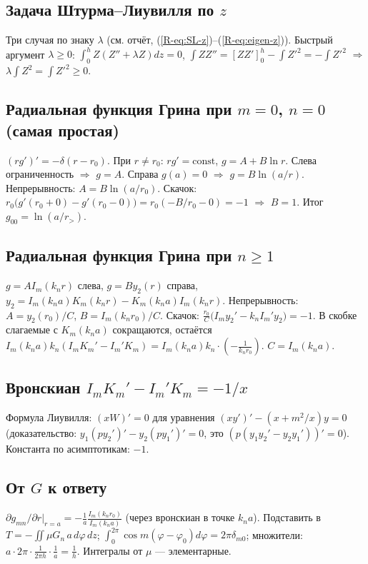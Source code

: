 \documentclass[a4paper,12pt]{article}
\renewcommand{\ge}{\geqslant}
\newcommand{\rf}[1]{(\ref*{R-#1})}
\begin{document}
\subsection{Задача Штурма–Лиувилля по $z$}
\label{der:sl}
Три случая по знаку $\lambda$ (см. отчёт, \rf{eq:SL-z}--\rf{eq:eigen-z}).
Быстрый аргумент $\lambda\ge0$: $\int_0^hZ(Z''+\lambda Z)dz=0$,
$\int ZZ''=[ZZ']_0^h-\int Z'^2=-\int Z'^2$ $\Rightarrow$
$\lambda\int Z^2=\int Z'^2\ge0$.

\subsection{Радиальная функция Грина при $m=0$, $n=0$ (самая простая)}
\label{der:g00}
$(rg')'=-\delta(r-r_0)$. При $r\ne r_0$: $rg'=\text{const}$, $g=A+B\ln r$.
Слева ограниченность $\Rightarrow$ $g=A$. Справа $g(a)=0$ $\Rightarrow$
$g=B\ln(a/r)$. Непрерывность: $A=B\ln(a/r_0)$. Скачок:
$r_0\bigl(g'(r_0+0)-g'(r_0-0)\bigr)=r_0(-B/r_0-0)=-1$ $\Rightarrow$ $B=1$.
Итог $g_{00}=\ln(a/r_>)$.

\subsection{Радиальная функция Грина при $n\ge1$}
\label{der:gn}
$g=AI_m(k_nr)$ слева, $g=By_2(r)$ справа,
$y_2=I_m(k_na)K_m(k_nr)-K_m(k_na)I_m(k_nr)$. Непрерывность: $A=y_2(r_0)/C$,
$B=I_m(k_nr_0)/C$. Скачок: $\frac{r_0}{C}\bigl(I_my_2'-k_nI_m'y_2\bigr)=-1$.
В скобке слагаемые с $K_m(k_na)$ сокращаются, остаётся
$I_m(k_na)k_n(I_mK_m'-I_m'K_m)=I_m(k_na)k_n\cdot(-\frac{1}{k_nr_0})$.
$C=I_m(k_na)$.

\subsection{Вронскиан $I_mK_m'-I_m'K_m=-1/x$}
\label{der:w}
Формула Лиувилля: $(xW)'=0$ для уравнения $(xy')'-(x+m^2/x)y=0$
(доказательство: $y_1(py_2')'-y_2(py_1')'=0$, это $(p(y_1y_2'-y_2y_1'))'=0$).
Константа по асимптотикам: $-1$.

\subsection{От $G$ к ответу}
\label{der:final}
$\partial g_{mn}/\partial r|_{r=a}=-\frac{1}{a}\frac{I_m(k_nr_0)}{I_m(k_na)}$
(через вронскиан в точке $k_na$). Подставить в $T=-\iint\mu G_n\,a\,d\varphi\,dz$;
$\int_0^{2\pi}\cos m(\varphi-\varphi_0)d\varphi=2\pi\delta_{m0}$; множители:
$a\cdot2\pi\cdot\frac{1}{2\pi h}\cdot\frac1a=\frac1h$. Интегралы от $\mu$ —
элементарные.
\end{document}
